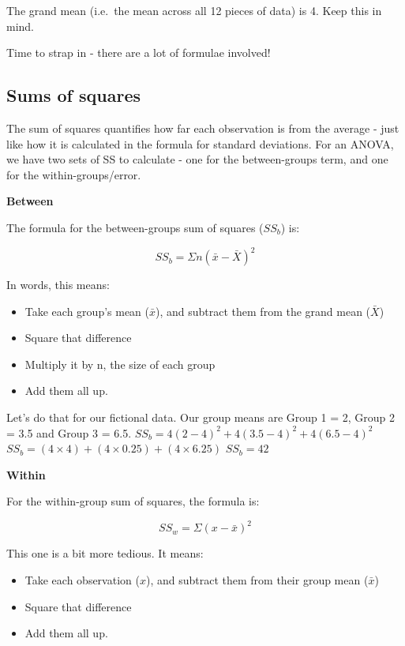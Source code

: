 \documentclass[
]{book}
\providecommand{\tightlist}{%
  \setlength{\itemsep}{0pt}\setlength{\parskip}{0pt}}
\begin{document}
The grand mean (i.e.~the mean across all 12 pieces of data) is 4. Keep
this in mind.

Time to strap in - there are a lot of formulae involved!

\subsection{Sums of squares}\label{sums-of-squares}

The sum of squares quantifies how far each observation is from the
average - just like how it is calculated in the formula for standard
deviations. For an ANOVA, we have two sets of SS to calculate - one for
the between-groups term, and one for the within-groups/error.

\textbf{Between}

The formula for the between-groups sum of squares (\(SS_b\)) is:

\[
SS_b = \Sigma n(\bar x - \bar X)^2
\]

In words, this means:

\begin{itemize}
\tightlist
\item
  Take each group's mean (\(\bar x\)), and subtract them from the grand
  mean (\(\bar X\))
\item
  Square that difference
\item
  Multiply it by n, the size of each group
\item
  Add them all up.
\end{itemize}

Let's do that for our fictional data. Our group means are Group 1 = 2,
Group 2 = 3.5 and Group 3 = 6.5.
\(SS_b = 4(2-4)^2 + 4(3.5-4)^2 + 4(6.5-4)^2\)
\(SS_b = (4 \times 4) + (4 \times 0.25) + (4 \times 6.25)\) \(SS_b = 42\)

\textbf{Within}

For the within-group sum of squares, the formula is:

\[
SS_w = \Sigma (x - \bar x)^2
\]

This one is a bit more tedious. It means:

\begin{itemize}
\tightlist
\item
  Take each observation (\(x\)), and subtract them from their group mean
  (\(\bar x\))
\item
  Square that difference
\item
  Add them all up.
\end{itemize}
\end{document}
